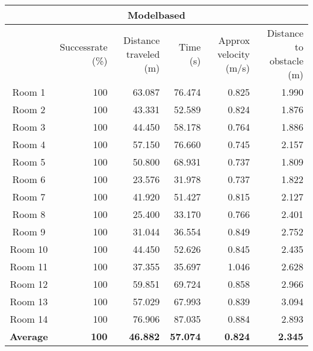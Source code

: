 \documentclass[../Head/Main.tex]{subfiles}
\begin{document}
	\begin{tabular}{|c|r|r|r|r|r|}
		\hline
		\multicolumn{6}{|c|}{\textbf{Modelbased}} \\ \hline
		 & Successrate (\%) & Distance traveled (m) & Time (s) & 				Approx velocity (m/s) & Distance to obstacle (m) \\ \hline
		Room 1 & 100 & 63.087 & 76.474 & 0.825 & 1.990 \\ \hline
		Room 2 & 100 & 43.331 & 52.589 & 0.824 & 1.876 \\ \hline
		Room 3 & 100 & 44.450 & 58.178 & 0.764 & 1.886 \\ \hline
		Room 4 & 100 & 57.150 & 76.660 & 0.745 & 2.157 \\ \hline
		Room 5 & 100 & 50.800 & 68.931 & 0.737 & 1.809 \\ \hline
		Room 6 & 100 & 23.576 & 31.978 & 0.737 & 1.822 \\ \hline
		Room 7 & 100 & 41.920 & 51.427 & 0.815 & 2.127 \\ \hline
		Room 8 & 100 & 25.400 & 33.170 & 0.766 & 2.401 \\ \hline
		Room 9 & 100 & 31.044 & 36.554 & 0.849 & 2.752 \\ \hline
		Room 10 & 100 & 44.450 & 52.626 & 0.845 & 2.435 \\ \hline
		Room 11 & 100 & 37.355 & 35.697 & 1.046 & 2.628 \\ \hline
		Room 12 & 100 & 59.851 & 69.724 & 0.858 & 2.966 \\ \hline
		Room 13 & 100 & 57.029 & 67.993 & 0.839 & 3.094 \\ \hline
		Room 14 & 100 & 76.906 & 87.035 & 0.884 & 2.893 \\ \hline
		\textbf{Average} & \textbf{100} & \textbf{46.882} & \textbf{57.074} & \textbf{0.824} & \textbf{2.345} \\ \hline
	\end{tabular}
\end{document}
